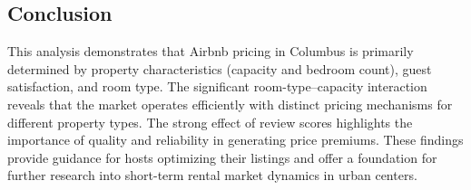 \documentclass[9pt,a4paper,onecolumn,twoside]{tau-class/tau}
\begin{document}
\subsection{Conclusion}

This analysis demonstrates that Airbnb pricing in Columbus is primarily determined by property characteristics (capacity and bedroom count), guest satisfaction, and room type. The significant room-type--capacity interaction reveals that the market operates efficiently with distinct pricing mechanisms for different property types. The strong effect of review scores highlights the importance of quality and reliability in generating price premiums. These findings provide guidance for hosts optimizing their listings and offer a foundation for further research into short-term rental market dynamics in urban centers.

\end{document}
